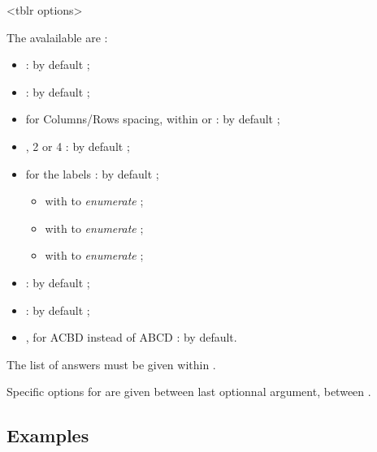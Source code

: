 \documentclass[english,11pt,a4paper]{article}
\begin{document}
\begin{codehigh}[language=latex/latex3,style/main=teal!25,style/code=teal!25]
<tblr options>
\end{codehigh}

The avalailable  are :

\begin{itemize}
	\item {} :  by default ;
	\item {}  :  by default ;
	\item {} for Columns/Rows spacing, within  or  : \MontreCode{6pt/2pt} by default ;
	\item {}, 2 or 4 :  by default ;
	\item {} for the labels :  by default ;
	\begin{itemize}
		\item with  to \textit{enumerate}  ;
		\item with  to \textit{enumerate}  ;
		\item with  to \textit{enumerate}  ;
	\end{itemize}
	\item {} :  by default ;
	\item {} :  by default ;
	\item {}, for ACBD instead of ABCD :  by default.
\end{itemize}

The list of answers must be given within .

Specific options for  are given between last optionnal argument, between .

\subsection{Examples}

\begin{demohigh}[language=latex/latex3,style/main=teal!25,style/code=teal!25]
\end{demohigh}
\end{document}
